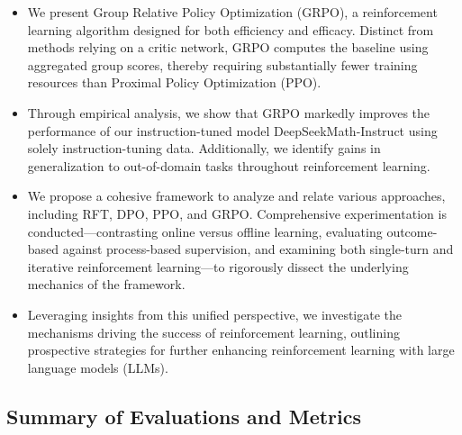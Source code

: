 \begin{itemize}[topsep=0pt]
    \item We present Group Relative Policy Optimization (GRPO), a reinforcement learning algorithm designed for both efficiency and efficacy. Distinct from methods relying on a critic network, GRPO computes the baseline using aggregated group scores, thereby requiring substantially fewer training resources than Proximal Policy Optimization (PPO).
    \item Through empirical analysis, we show that GRPO markedly improves the performance of our instruction-tuned model DeepSeekMath-Instruct using solely instruction-tuning data. Additionally, we identify gains in generalization to out-of-domain tasks throughout reinforcement learning.
    \item We propose a cohesive framework to analyze and relate various approaches, including RFT, DPO, PPO, and GRPO. Comprehensive experimentation is conducted—contrasting online versus offline learning, evaluating outcome-based against process-based supervision, and examining both single-turn and iterative reinforcement learning—to rigorously dissect the underlying mechanics of the framework.
    \item Leveraging insights from this unified perspective, we investigate the mechanisms driving the success of reinforcement learning, outlining prospective strategies for further enhancing reinforcement learning with large language models (LLMs).
\end{itemize}

\subsection{Summary of Evaluations and Metrics}

